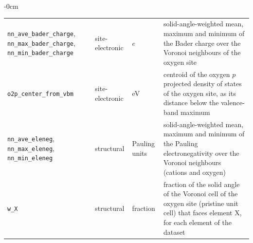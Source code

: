 \begin{table}[H]
\begin{adjustwidth}{-\extralength}{0cm}
\begin{tabularx}{\linewidth}{@{}>{\raggedright\arraybackslash}Xll>{\raggedright\arraybackslash}X@{}}
\texttt{nn\_ave\_bader\_charge}, \texttt{nn\_max\_bader\_charge}, \texttt{nn\_min\_bader\_charge} & site-electronic & $e$ & solid-angle-weighted mean, maximum and minimum of the Bader charge over the Voronoi neighbours of the oxygen site \\
\texttt{o2p\_center\_from\_vbm} & site-electronic & eV & centroid of the oxygen $p$ projected density of states of the oxygen site, as its distance below the valence-band maximum \citep{Deml2015intrinsic} \\
\addlinespace
\texttt{nn\_ave\_eleneg}, \texttt{nn\_max\_eleneg}, \texttt{nn\_min\_eleneg} & structural & Pauling units & solid-angle-weighted mean, maximum and minimum of the Pauling electronegativity over the Voronoi neighbours (cations and oxygen) \\
\texttt{w\_X} & structural & fraction & fraction of the solid angle of the Voronoi cell of the oxygen site (pristine unit cell) that faces element X, for each element of the dataset \\
\bottomrule
\end{tabularx}
\end{adjustwidth}
\end{table}
